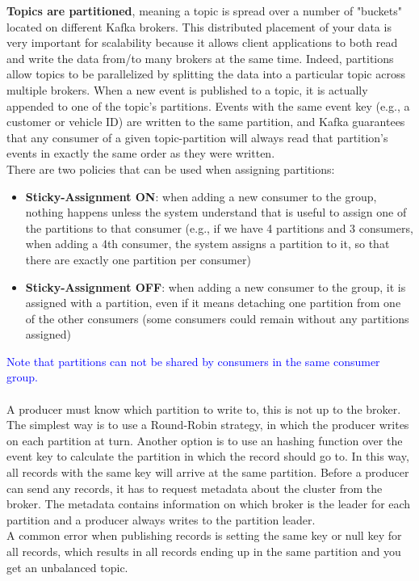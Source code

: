 \documentclass[10pt,a4paper]{article}
\newcommand{\nline}{\\~\\}
\begin{document}
\textbf{Topics are partitioned}, meaning a topic is spread over a number of "buckets" located on different Kafka brokers. This distributed placement of your data is very important for scalability because it allows client applications to both read and write the data from/to many brokers at the same time. Indeed, partitions allow topics to be parallelized by splitting the data into a particular topic across multiple brokers. When a new event is published to a topic, it is actually appended to one of the topic's partitions. Events with the same event key (e.g., a customer or vehicle ID) are written to the same partition, and Kafka guarantees that any consumer of a given topic-partition will always read that partition's events in exactly the same order as they were written. \\ \pagebreak
There are two policies that can be used when assigning partitions:
\begin{itemize}
	\item \textbf{Sticky-Assignment ON}: when adding a new consumer to the group, nothing happens unless the system understand that is useful to assign one of the partitions to that consumer (e.g., if we have 4 partitions and 3 consumers, when adding a 4th consumer, the system assigns a partition to it, so that there are exactly one partition per consumer)
	\item \textbf{Sticky-Assignment OFF}: when adding a new consumer to the group, it is assigned with a partition, even if it means detaching one partition from one of the other consumers (some consumers could remain without any partitions assigned)
\end{itemize}
\textcolor{blue}{Note that partitions can not be shared by consumers in the same consumer group.} 
\nline
A producer must know which partition to write to, this is not up to the broker. The simplest way is to use a Round-Robin strategy, in which the producer writes on each partition at turn. Another option is to use an hashing function over the event key to calculate the partition in which the record should go to. In this way, all records with the same key will arrive at the same partition. Before a producer can send any records, it has to request metadata about the cluster from the broker. The metadata contains information on which broker is the leader for each partition and a producer always writes to the partition leader. \\
A common error when publishing records is setting the same key or null key for all records, which results in all records ending up in the same partition and you get an unbalanced topic.
\end{document}
